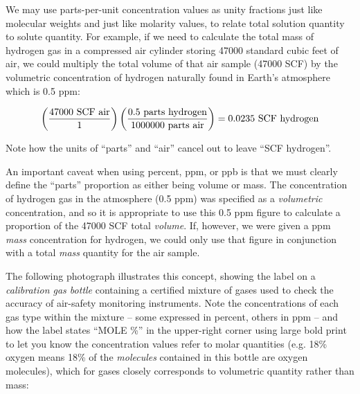 We may use parts-per-unit concentration values as unity fractions just like molecular weights and just like molarity values, to relate total solution quantity to solute quantity.  For example, if we need to calculate the total mass of hydrogen gas in a compressed air cylinder storing 47000 standard cubic feet of air, we could multiply the total volume of that air sample (47000 SCF) by the volumetric concentration of hydrogen naturally found in Earth's atmosphere which is 0.5 ppm:

$$\left({47000 \hbox{ SCF air} \over 1}\right) \left({0.5 \hbox{ parts hydrogen} \over 1000000 \hbox{ parts air}}\right) = 0.0235 \hbox{ SCF hydrogen}$$

Note how the units of ``parts'' and ``air'' cancel out to leave ``SCF hydrogen''.  

\filbreak

An important caveat when using percent, ppm, or ppb is that we must clearly define the ``parts'' proportion as either being volume or mass.  The concentration of hydrogen gas in the atmosphere (0.5 ppm) was specified as a \textit{volumetric} concentration, and so it is appropriate to use this 0.5 ppm figure to calculate a proportion of the 47000 SCF total \textit{volume}.  If, however, we were given a ppm \textit{mass} concentration for hydrogen, we could only use that figure in conjunction with a total \textit{mass} quantity for the air sample.

The following photograph illustrates this concept, showing the label on a \textit{calibration gas bottle} containing a certified mixture of gases used to check the accuracy of air-safety monitoring instruments.  Note the concentrations of each gas type within the mixture -- some expressed in percent, others in ppm -- and how the label states ``MOLE \%'' in the upper-right corner using large bold print to let you know the concentration values refer to molar quantities (e.g. 18\% oxygen means 18\% of the \textit{molecules} contained in this bottle are oxygen molecules), which for gases closely corresponds to volumetric quantity rather than mass:    

